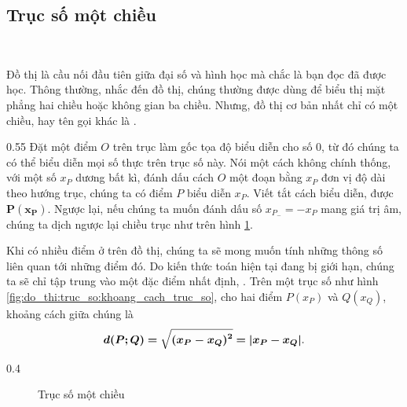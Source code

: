 \subsection{Trục số một chiều}

\ %

Đồ thị là cầu nối đầu tiên giữa đại số và hình học mà chắc là bạn đọc đã được học. Thông thường, nhắc đến đồ thị, chúng thường được dùng để biểu thị mặt phẳng hai chiều hoặc không gian ba chiều. Nhưng, đồ thị cơ bản nhất chỉ có một chiều, hay tên gọi khác là . 

{
   \begin{minipageindent}{0.55\textwidth}
      Đặt một điểm $O$ trên trục làm gốc tọa độ biểu diễn cho số $0$, từ đó chúng ta có thể biểu diễn mọi số thực trên trục số này. Nói một cách không chính thống, với một số $x_P$ dương bất kì, đánh dấu cách $O$ một đoạn bằng $x_P$ đơn vị độ dài theo hướng trục, chúng ta có điểm $P$ biểu diễn $x_P$. Viết tắt cách biểu diễn, được $\bm{P(x_P)}$. Ngược lại, nếu chúng ta muốn đánh dấu số $x_{P_-}=-x_P$ mang giá trị âm, chúng ta dịch ngược lại chiều trục như trên hình \ref{fig:do_thi:truc_so:truc_so_mot_chieu}.
      
      Khi có nhiều điểm ở trên đồ thị, chúng ta sẽ mong muốn tính những thông số liên quan tới những điểm đó. Do kiến thức toán hiện tại đang bị giới hạn, chúng ta sẽ chỉ tập trung vào một đặc điểm nhất định, . Trên một trục số như hình \ref{fig:do_thi:truc_so:khoang_cach_truc_so}, cho hai điểm $P(x_P)$ và $Q(x_Q)$, khoảng cách giữa chúng là $$\bm{d(P;Q)=\sqrt{(x_P-x_Q)^2}=|x_P-x_Q|}.$$
   \end{minipageindent}
   \hfill
   \begin{minipageindent}{0.4\textwidth}
      \begin{figure}[H]
         \centering
         \caption{Trục số một chiều}
         \label{fig:do_thi:truc_so:truc_so_mot_chieu}
      \end{figure}
      

\end{minipageindent}}
